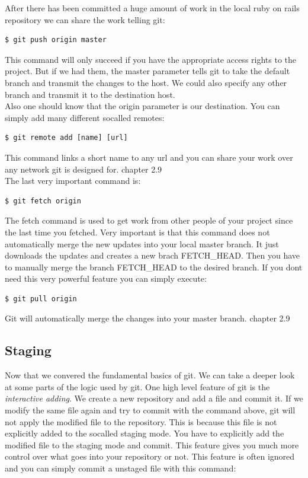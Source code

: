 After there has been committed a huge amount of work in the local ruby on rails
repository we can share the work telling git:

\begin{lstlisting}
$ git push origin master 
\end{lstlisting}

This command will only succeed if you have the appropriate access rights to the
project. But if we had them, the master parameter tells git to take the default
branch and transmit the changes to the host. We could also specify any other
branch and transmit it to the destination host. \\ 

Also one should know that the origin parameter is our destination. You can
simply add many different socalled remotes:

\begin{lstlisting}
$ git remote add [name] [url]
\end{lstlisting}

This command links a short name to any url and you can share your
work over any network git is designed for. \cite{gitpro2009} chapter 2.9 \\

The last very important command is:
\begin{lstlisting}
$ git fetch origin
\end{lstlisting}

The fetch command is used to get work from other people of your project since
the last time you fetched. Very important is that this command does not
automatically merge the new updates into your local master branch. It just
downloads the updates and creates a new brach FETCH\_HEAD. Then you have to
manually merge the branch FETCH\_HEAD to the desired branch. 
If you dont need this very powerful feature you can simply execute:
\begin{lstlisting}
$ git pull origin
\end{lstlisting}
Git will automatically merge the changes into your master branch.
\cite{gitpro2009} chapter 2.9 \\

\subsection {Staging}

Now that we convered the fundamental basics of git. We can take a deeper look at
some parts of the logic used by git. One high level feature of git is the
\emph{interactive adding}. We create a new repository and add a file and commit
it. If we modify the same file again and try to commit with the command above,
git will not apply the modified file to the repository. This is because this file is
not explicitly added to the socalled staging mode. You have to explicitly add
the modified file to the staging mode and commit. This feature gives you much
more control over what goes into your repository or not. This feature is often
ignored and you can simply commit a unstaged file with this command:

